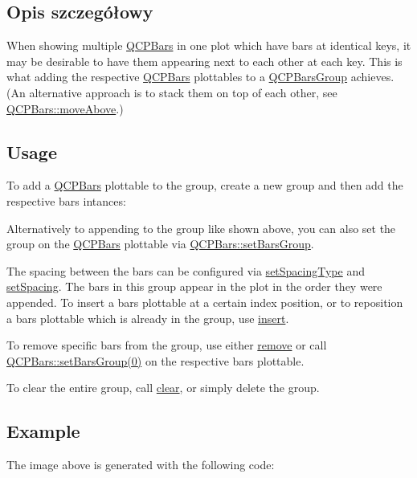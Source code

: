 \subsection{Opis szczegółowy}


When showing multiple \hyperlink{class_q_c_p_bars}{Q\+C\+P\+Bars} in one plot which have bars at identical keys, it may be desirable to have them appearing next to each other at each key. This is what adding the respective \hyperlink{class_q_c_p_bars}{Q\+C\+P\+Bars} plottables to a \hyperlink{class_q_c_p_bars_group}{Q\+C\+P\+Bars\+Group} achieves. (An alternative approach is to stack them on top of each other, see \hyperlink{class_q_c_p_bars_ac22e00a6a41509538c21b04f0a57318c}{Q\+C\+P\+Bars\+::move\+Above}.)\hypertarget{class_q_c_p_bars_group_qcpbarsgroup-usage}{}\subsection{Usage}\label{class_q_c_p_bars_group_qcpbarsgroup-usage}
To add a \hyperlink{class_q_c_p_bars}{Q\+C\+P\+Bars} plottable to the group, create a new group and then add the respective bars intances\+: 
\begin{DoxyCodeInclude}
\end{DoxyCodeInclude}
Alternatively to appending to the group like shown above, you can also set the group on the \hyperlink{class_q_c_p_bars}{Q\+C\+P\+Bars} plottable via \hyperlink{class_q_c_p_bars_aedd1709061f0b307c47ddb45e172ef9a}{Q\+C\+P\+Bars\+::set\+Bars\+Group}.

The spacing between the bars can be configured via \hyperlink{class_q_c_p_bars_group_a2c7e2d61b10594a4555b615e1fcaf49e}{set\+Spacing\+Type} and \hyperlink{class_q_c_p_bars_group_aa553d327479d72a0c3dafcc724a190e2}{set\+Spacing}. The bars in this group appear in the plot in the order they were appended. To insert a bars plottable at a certain index position, or to reposition a bars plottable which is already in the group, use \hyperlink{class_q_c_p_bars_group_a309a5f7233db189f3ea9c2d04ece6c13}{insert}.

To remove specific bars from the group, use either \hyperlink{class_q_c_p_bars_group_a215e28a5944f1159013a0e19169220e7}{remove} or call \hyperlink{class_q_c_p_bars_aedd1709061f0b307c47ddb45e172ef9a}{Q\+C\+P\+Bars\+:\+:set\+Bars\+Group(0)} on the respective bars plottable.

To clear the entire group, call \hyperlink{class_q_c_p_bars_group_a3ddf23928c6cd89530bd34ab7ba7b177}{clear}, or simply delete the group.\hypertarget{class_q_c_p_bars_group_qcpbarsgroup-example}{}\subsection{Example}\label{class_q_c_p_bars_group_qcpbarsgroup-example}
The image above is generated with the following code\+: 
\begin{DoxyCodeInclude}
\end{DoxyCodeInclude}


